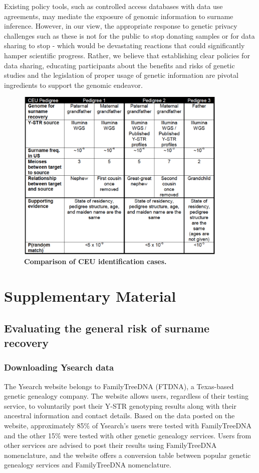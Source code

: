 Existing policy tools, such as controlled access databases with data use agreements, may mediate the exposure of genomic information to surname inference. However, in our view, the appropriate response to genetic privacy challenges such as these is not for the public to stop donating samples or for data sharing to stop - which would be devastating reactions that could significantly hamper scientific progress. Rather, we believe that establishing clear policies for data sharing, educating participants about the benefits and risks of genetic studies \cite{McGuireGibbs2006} and the legislation of proper usage of genetic information are pivotal ingredients to support the genomic endeavor.

\begin{figure}[h!]
\centering
\label{tab:surtab1}
\includegraphics[width=0.9\textwidth]{Figures/App1/Table1.pdf}
\caption{\textbf{Comparison of CEU identification cases.}}
\end{figure}

\section{Supplementary Material}
\label{sec:sursm}

\subsection{Evaluating the general risk of surname recovery}
\subsubsection{Downloading Ysearch data}
The Ysearch website belongs to FamilyTreeDNA (FTDNA), a Texas-based genetic genealogy company. The website allows users, regardless of their testing service, to voluntarily post their Y-STR genotyping results along with their ancestral information and contact details. Based on the data posted on the website, approximately 85\% of Ysearch’s users were tested with FamilyTreeDNA and the other 15\% were tested with other genetic genealogy services. Users from other services are advised to post their results using FamilyTreeDNA nomenclature, and the website offers a conversion table between popular genetic genealogy services and FamilyTreeDNA nomenclature.

